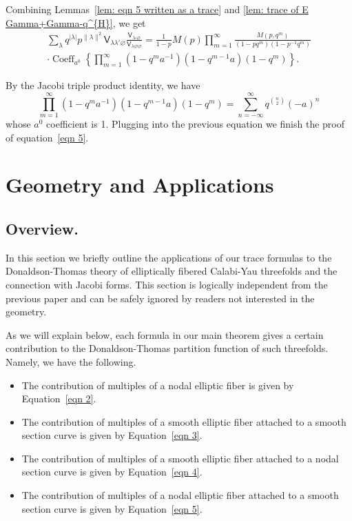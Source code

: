 \documentclass[12pt]{amsart}
\newcommand{\Vsf}{\mathsf{V}}
\newcommand{\bx}{\square}
\renewcommand{\emptyset}{\varnothing}
\theoremstyle{definition}
\begin{document}
Combining Lemmas~\ref{lem: eqn 5 written as a trace} and \ref{lem:
trace of E Gamma+Gamma-q^{H}}, we get
\begin{multline*}
\sum_{\lambda} q^{|\lambda |} p^{\| \lambda \|  ^{2}} \Vsf_{\lambda \lambda' \emptyset} \frac{\Vsf_{\lambda
\bx \emptyset}}{\Vsf_{\lambda \emptyset \emptyset}} =\frac{1}{1-p} M(p)\prod_{m=1}^{\infty}
\frac{M(p,q^{m})}{(1-pq^{m})(1-p^{-1}q^{m})}\\
 \cdot \operatorname{Coeff}_{a^{0}}\left\{\prod_{m=1}^{\infty}
(1-q^{m}a^{-1})(1-q^{m-1}a)(1-q^{m}) \right\}.
\end{multline*}

By the Jacobi triple product identity, we have
\[
\prod_{m=1}^{\infty} (1-q^{m}a^{-1})(1-q^{m-1}a)(1-q^{m}) =
\sum_{n=-\infty}^{\infty} q^{\binom{n}{2}} (-a)^{n}
\]
whose $a^{0}$ coefficient is 1. Plugging into the previous equation we
finish the proof of equation~\eqref{eqn 5}.

\section{Geometry and Applications}\label{sec: geometry and applications}


\subsection{Overview.} In this section we briefly outline the
applications of our trace formulas to the Donaldson-Thomas theory of
elliptically fibered Calabi-Yau threefolds
\cite{Bryan-K3xE,Bryan-Kool,BOPY} and the connection with Jacobi
forms. This section is logically independent from the previous paper
and can be safely ignored by readers not interested in the geometry.

As we will explain below, each formula in our main theorem gives a
certain contribution to the Donaldson-Thomas partition function of
such threefolds. Namely, we have the following.
\begin{itemize}
\item The contribution of multiples of a nodal elliptic fiber is given
by Equation~\eqref{eqn 2}.
\item The contribution of multiples of a smooth elliptic fiber
attached to a smooth section curve is given by Equation~\eqref{eqn 3}.
\item The contribution of multiples of a smooth elliptic fiber
attached to a nodal section curve is given by Equation~\eqref{eqn 4}.
\item The contribution of multiples of a nodal elliptic fiber
attached to a smooth section curve is given by Equation~\eqref{eqn 5}.
\end{itemize}
\end{document}
